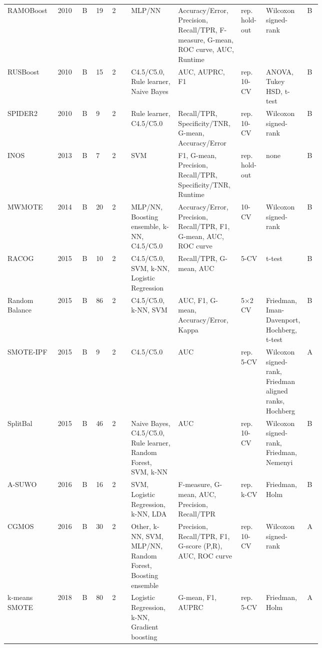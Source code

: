 \begin{longtable}{@{}p{0.13\linewidth}lllp{0.06\linewidth}p{0.15\linewidth}p{0.2\linewidth}p{0.08\linewidth}p{0.11\linewidth}l@{}}
RAMOBoost~\parencite{chen2010ramoboost} & 2010 & B & 19 & 2 & MLP/NN & Accuracy/Error, Precision, Recall/TPR, F-measure, G-mean, ROC curve, AUC, Runtime & rep. hold-out & Wilcoxon signed-rank & B\\
RUSBoost~\parencite{seiffert2010rusboost} & 2010 & B & 15 & 2 & C4.5/C5.0, Rule learner, Naive Bayes & AUC, AUPRC, F1 & rep. 10-CV & ANOVA, Tukey HSD, t-test & B\\
SPIDER2~\parencite{napierala2010spider2} & 2010 & B & 9 & 2 & Rule learner, C4.5/C5.0 & Recall/TPR, Specificity/TNR, G-mean, Accuracy/Error & rep. 10-CV & Wilcoxon signed-rank & B\\
INOS~\parencite{cao2013inos} & 2013 & B & 7 & 2 & SVM & F1, G-mean, Precision, Recall/TPR, Specificity/TNR, Runtime & rep. hold-out & none & B\\
MWMOTE~\parencite{barua2014mwmote} & 2014 & B & 20 & 2 & MLP/NN, Boosting ensemble, k-NN, C4.5/C5.0 & Accuracy/Error, Precision, Recall/TPR, F1, G-mean, AUC, ROC curve & 10-CV & Wilcoxon signed-rank & B\\
RACOG~\parencite{das2015racog} & 2015 & B & 10 & 2 & C4.5/C5.0, SVM, k-NN, Logistic Regression & Recall/TPR, G-mean, AUC & 5-CV & t-test & B\\
Random Balance~\parencite{diezpastor2015randombalance} & 2015 & B & 86 & 2 & C4.5/C5.0, k-NN, SVM & AUC, F1, G-mean, Accuracy/Error, Kappa & 5$\times$2 CV & Friedman, Iman-Davenport, Hochberg, t-test & B\\
SMOTE-IPF~\parencite{saez2015smoteipf} & 2015 & B & 9 & 2 & C4.5/C5.0 & AUC & rep. 5-CV & Wilcoxon signed-rank, Friedman aligned ranks, Hochberg & A\\
SplitBal~\parencite{sun2015splitbal} & 2015 & B & 46 & 2 & Naive Bayes, C4.5/C5.0, Rule learner, Random Forest, SVM, k-NN & AUC & rep. 10-CV & Wilcoxon signed-rank, Friedman, Nemenyi & B\\
A-SUWO~\parencite{nekooeimehr2016asuwo} & 2016 & B & 16 & 2 & SVM, Logistic Regression, k-NN, LDA & F-measure, G-mean, AUC, Precision, Recall/TPR & rep. k-CV & Friedman, Holm & B\\
CGMOS~\parencite{zhang2016cgmos} & 2016 & B & 30 & 2 & Other, k-NN, SVM, MLP/NN, Random Forest, Boosting ensemble & Precision, Recall/TPR, F1, G-score (P,R), AUC, ROC curve & rep. 10-CV & Wilcoxon signed-rank & A\\
k-means SMOTE~\parencite{douzas2018kmeans} & 2018 & B & 80 & 2 & Logistic Regression, k-NN, Gradient boosting & G-mean, F1, AUPRC & rep. 5-CV & Friedman, Holm & A\\

\end{longtable}
